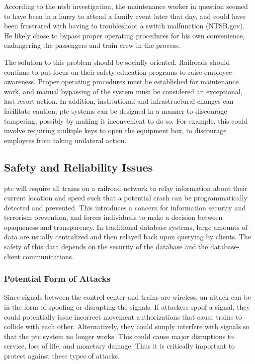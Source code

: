 \documentclass[11pt, titlepage]{article}
\begin{document}
According to the \gls{ntsb} investigation, the maintenance worker in question seemed
to have been in a hurry to attend a family event later that day, and could have been
frustrated with having to troubleshoot a switch malfunction (NTSB.gov). He likely
chose to bypass proper operating procedures for his own convenience, endangering the
passengers and train crew in the process.

The solution to this problem should be socially oriented. Railroads should continue
to put focus on their safety education programs to raise employee awareness. Proper
operating procedures must be established for maintenance work, and manual bypassing
of the system must be considered an exceptional, last resort action. In addition,
institutional and infrastructural changes can facilitate caution; \gls{ptc} systems
can be designed in a manner to discourage tampering, possibly by making it
inconvenient to do so. For example, this could involve requiring multiple keys to
open the equipment box, to discourage employees from taking unilateral action.

\subsection{Safety and Reliability Issues}

\gls{ptc} will require all trains on a railroad network to relay information about
their current location and speed such that a potential crash can be programmatically
detected and prevented. This introduces a concern for information security and
terrorism prevention, and forces individuals to make a decision between opaqueness
and transparency. In traditional database systems, large amounts of data are usually
centralized and then relayed back upon querying by clients. The safety of this data
depends on the security of the database and the database-client communications.

\subsubsection{Potential Form of Attacks}

Since signals between the control center and trains are wireless, an attack can be
in the form of spoofing or disrupting the signals. If attackers spoof a signal, they
could potentially issue incorrect movement authorizations that cause trains to
collide with each other. Alternatively, they could simply interfere with signals so
that the \gls{ptc} system no longer works. This could cause major disruptions to
service, loss of life, and monetary damage. Thus it is critically important to
protect against these types of attacks.
\end{document}
